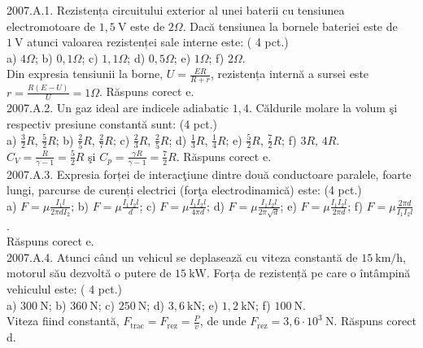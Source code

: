 
2007.A.1. Rezistența circuitului exterior al unei baterii cu tensiunea electromotoare de $1,5 \mathrm{~V}$ este de $2 \Omega$. Dacă tensiunea la bornele bateriei este de $1 \mathrm{~V}$ atunci valoarea rezistenței sale interne este: ( 4 pct.)\\ a) $4 \Omega$; b) $0,1 \Omega$; c) $1,1 \Omega$; d) $0,5 \Omega$; e) $1 \Omega$; f) $2 \Omega$.\\ Din expresia tensiunii la borne, $U=\frac{E R}{R+r}$, rezistența internă a sursei este $r=\frac{R(E-U)}{U}=1 \Omega$. Răspuns corect e.\\

2007.A.2. Un gaz ideal are indicele adiabatic $1,4$. Căldurile molare la volum şi respectiv presiune constantă sunt: (4 pct.)\\ a) $\frac{3}{2} R$, $\frac{5}{2} R$; b) $\frac{2}{5} R$, $\frac{2}{7} R$; c) $\frac{2}{3} R$, $\frac{2}{5} R$; d) $\frac{1}{3} R$, $\frac{1}{4} R$; e) $\frac{5}{2} R$, $\frac{7}{2} R$; f) $3 R$, $4 R$.\\ $C_{V}=\frac{R}{\gamma-1}=\frac{5}{2} R$ şi $C_{p}=\frac{\gamma R}{\gamma-1}=\frac{7}{2} R$. Răspuns corect e.\\

2007.A.3. Expresia forței de interacţiune dintre două conductoare paralele, foarte lungi, parcurse de curenți electrici (forţa electrodinamică) este: (4 pct.)\\ a) $F=\mu \frac{I_{1} l}{2 \pi d I_{2}}$; b) $F=\mu \frac{I_{1} I_{2} l}{d}$; c) $F=\mu \frac{I_{1} I_{2} l}{4 \pi d}$; d) $F=\mu \frac{I_{1} I_{2} l}{2 \pi \sqrt{d}}$; e) $F=\mu \frac{I_{1} I_{2} l}{2 \pi d}$;  f) $F=\mu \frac{2 \pi d}{I_{1} I_{2} l}$.\\ Răspuns corect e.\\

2007.A.4. Atunci când un vehicul se deplasează cu viteza constantă de $15 \mathrm{~km} / \mathrm{h}$, motorul său dezvoltă o putere de $15 \mathrm{~kW}$. Forța de rezistență pe care o întâmpină vehiculul este: ( 4 pct.)\\ a) $300 \mathrm{~N}$; b) $360 \mathrm{~N}$; c) $250 \mathrm{~N}$; d) $3,6 \mathrm{~kN}$; e) $1,2 \mathrm{~kN}$; f) $100 \mathrm{~N}$.\\ Viteza fiind constantă, $F_{\text {trac}}=F_{\text {rez}}=\frac{P}{v}$, de unde $F_{\text {rez}}=3,6 \cdot 10^{3} \mathrm{~N}$. Răspuns corect d.\\

